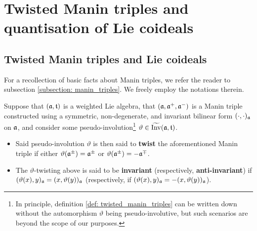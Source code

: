\section{Twisted Manin triples and quantisation of Lie coideals}
    \subsection{Twisted Manin triples and Lie coideals}
        For a recollection of basic facts about Manin triples, we refer the reader to subsection \ref{subsection: manin_triples}. We freely employ the notations therein.
    
        \begin{definition} \label{def: twisted_manin_triples}
            Suppose that $(\mathfrak{a}, \mathfrak{t})$ is a weighted Lie algebra, that $(\mathfrak{a}, \mathfrak{a}^+, \mathfrak{a}^-)$ is a Manin triple constructed using a symmetric, non-degenerate, and invariant bilinear form $(\cdot, \cdot)_{\mathfrak{a}}$ on $\mathfrak{a}$, and consider some pseudo-involution\footnote{In principle, definition \ref{def: twisted_manin_triples} can be written down without the automorphism $\vartheta$ being pseudo-involutive, but such scenarios are beyond the scope of our purposes.} $\vartheta \in \widetilde{\operatorname{Inv}}(\mathfrak{a}, \mathfrak{t})$.
            \begin{itemize}
                \item Said pseudo-involution $\vartheta$ is then said to \textbf{twist} the aforementioned Manin triple if either $\vartheta(\mathfrak{a}^{\pm}) = \mathfrak{a}^{\pm}$ or $\vartheta(\mathfrak{a}^{\pm}) = -\mathfrak{a}^{\mp}$.
                \item The $\vartheta$-twisting above is said to be \textbf{invariant} (respectively, \textbf{anti-invariant}) if $( \vartheta(x), y )_{\mathfrak{a}} = ( x, \vartheta(y) )_{\mathfrak{a}}$ (respectively, if $( \vartheta(x), y )_{\mathfrak{a}} = -( x, \vartheta(y) )_{\mathfrak{a}}$).
            \end{itemize}
        \end{definition}

